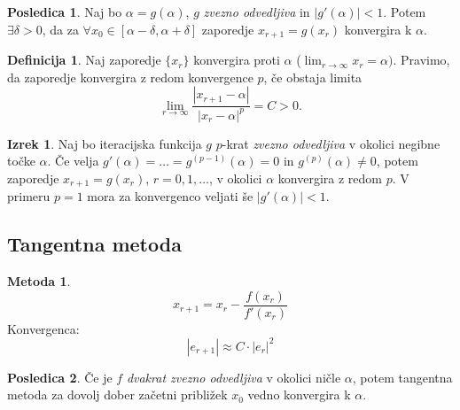 \documentclass[11pt]{article}
\theoremstyle{definition}
\newtheorem{definicija}{Definicija}[section]
\newtheorem{izrek}{Izrek}
\newtheorem*{posledica}{Posledica}
\newtheorem*{metoda}{Metoda}
\begin{document}
\begin{posledica}

Naj bo $\alpha = g(\alpha)$, $g$ \textit{zvezno odvedljiva} in $|g'(\alpha)| < 1$. Potem $\exists \delta > 0$, da za $\forall x_0 \in [\alpha - \delta, \alpha + \delta]$ zaporedje $x_{r+1} = g(x_r)$ konvergira k $\alpha$.

\end{posledica}
\vspace{0.5cm}

\begin{definicija}

Naj zaporedje $\{ x_r \}$ konvergira proti $\alpha$ ($\lim_{r \rightarrow \infty} x_r = \alpha)$. Pravimo, da zaporedje konvergira z redom konvergence $p$, če obstaja limita
$$\lim_{r \rightarrow \infty} \frac{|x_{r+1} - \alpha|}{|x_r - \alpha|^p} = C > 0.$$

\end{definicija}
\vspace{0.5cm}

\begin{izrek}

Naj bo iteracijska funkcija $g$ $p$-krat \textit{zvezno odvedljiva} v okolici negibne točke $\alpha$. Če velja $g'(\alpha) = \ldots = g^{(p-1)}(\alpha) = 0$ in $g^{(p)}(\alpha) \neq 0$, potem zaporedje $x_{r+1} = g(x_r)$, $r = 0, 1, \ldots$, v okolici $\alpha$ konvergira z redom $p$. V primeru $p = 1$ mora za konvergenco veljati še $|g'(\alpha)| < 1$. 

\end{izrek}
\vspace{0.5cm}


\subsection{Tangentna metoda}
\vspace{0.5cm}

\begin{metoda}

$$x_{r+1} = x_r - \frac{f(x_r)}{f'(x_r)}$$
Konvergenca:
$$|e_{r+1}| \approx C \cdot |e_r|^2$$

\end{metoda}
\vspace{0.5cm}

\begin{posledica}

Če je $f$ \textit{dvakrat zvezno odvedljiva} v okolici ničle $\alpha$, potem tangentna metoda za dovolj dober začetni približek $x_0$ vedno konvergira k $\alpha$.

\end{posledica}
\vspace{0.5cm}
\end{document}
